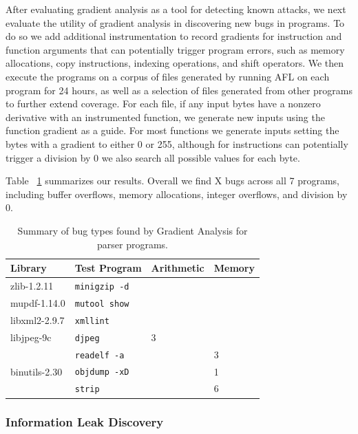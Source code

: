 After evaluating gradient analysis as a tool for detecting known attacks, we next evaluate the utility of gradient analysis in discovering new bugs in programs. To do so we add additional instrumentation to record gradients for instruction and function arguments that can potentially trigger program errors, such as memory allocations, copy instructions, indexing operations, and shift operators. We then execute the programs on a corpus of files generated by running AFL on each program for 24 hours, as well as a selection of files generated from other programs to further extend coverage. For each file, if any input bytes have a nonzero derivative with an instrumented function, we generate new inputs using the function gradient as a guide. For most functions we generate inputs setting the bytes with a gradient to either 0 or 255, although for instructions can potentially trigger a division by 0 we also search all possible values for each byte.

Table ~\ref{tab:bug_summary} summarizes our results. Overall we find X bugs across all 7 programs, including buffer overflows, memory allocations, integer overflows, and division by 0. 

\begin{table}
\centering
 \begin{tabular}{ll l l} 
 \toprule
  Library & Test Program & Arithmetic & Memory \\ 
 \midrule
 zlib-1.2.11    & \verb|minigzip -d| &     &  \\ 
 mupdf-1.14.0   & \verb|mutool show| &     &  \\  
 libxml2-2.9.7  & \verb|xmllint| &     &  \\
 libjpeg-9c     & \verb|djpeg| & 3    &  \\
                & \verb|readelf -a| &     &3  \\  
  binutils-2.30 & \verb|objdump -xD| & & 1 \\  
                & \verb|strip | &     & 6 \\  
 \bottomrule
 \end{tabular}
  \caption{Summary of bug types found by Gradient Analysis for parser programs.}
  \label{tab:bug_summary}
\end{table}



\subsubsection{Information Leak Discovery}

